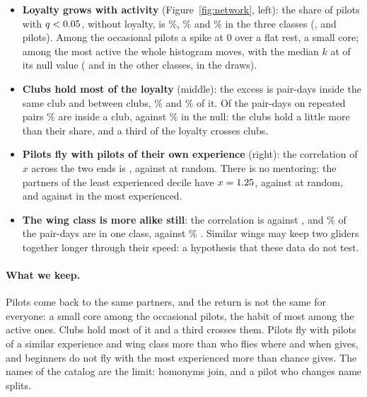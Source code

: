\begin{itemize}
  \item \textbf{Loyalty grows with activity} (Figure~\ref{fig:network}, left): the share of pilots
        with $q<0.05$, \StNwQLow{} without loyalty, is \StNwLowFew\%, \StNwLowMid\% and
        \StNwLowMany\% in the three classes (\StNwPilotsFew, \StNwPilotsMid{} and \StNwPilotsMany{}
        pilots). Among the occasional pilots a spike at 0 over a flat rest, a small core; among the
        most active the whole histogram moves, with the median $k$ at \StNwRatioMany{} of its null
        value (\StNwRatioFew{} and \StNwRatioMid{} in the other classes, \StNwRatioNullMany{} in the
        draws).
  \item \textbf{Clubs hold most of the loyalty} (middle): the excess is
        \StNwExcessSame{} \StNwExcessSameBand{} pair-days inside the same club and
        \StNwExcessDiff{} \StNwExcessDiffBand{} between clubs, \StNwShareSame\% and \StNwShareDiff\%
        of it. Of the pair-days on repeated pairs \StNwRealSame\% are inside a club, against
        \StNwNullSame\% in the null: the clubs hold a little more than their share, and a third of the
        loyalty crosses clubs.
  \item \textbf{Pilots fly with pilots of their own experience} (right): the correlation of $x$
        across the two ends is \StNwCorrX, against \StNwCorrXNull{} \StNwCorrXNullBand{} at random.
        There is no mentoring: the partners of the least experienced decile have $x=1.25$,
        against \StNwBeginnerNull{} \StNwBeginnerNullBand{} at random, and \StNwVeteran{} against
        \StNwVeteranNull{} \StNwVeteranNullBand{} in the most experienced.
  \item \textbf{The wing class is more alike still}: the correlation is \StNwCorrWing{} against
        \StNwCorrWingNull{} \StNwCorrWingNullBand, and \StNwSameWing\% of the pair-days are in one
        class, against \StNwSameWingNull\% \StNwSameWingNullBand. Similar wings may keep two gliders
        together longer through their speed: a hypothesis that these data do not test.
\end{itemize}

\paragraph{What we keep.} Pilots come back to the same partners, and the return is not the same for
everyone: a small core among the occasional pilots, the habit of most among the active ones. Clubs
hold most of it and a third crosses them. Pilots fly with pilots of a similar experience and
wing class more than who flies where and when gives, and beginners do not fly with the most
experienced more than chance gives. The names of the catalog are the limit: homonyms join, and a
pilot who changes name splits.

